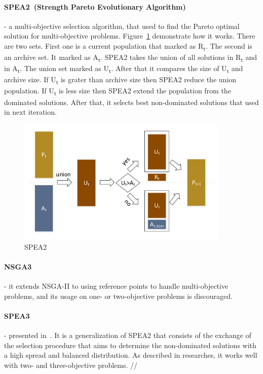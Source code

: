 \paragraph{SPEA2~(Strength Pareto Evolutionary Algorithm)~\cite{zitzler01}} - a multi-objective selection algorithm, that used to find the Pareto optimal solution for multi-objective problems\cite{zhihuan2010}. Figure~\ref{fig:spea2} demonstrate how it works.
There are two sets. First one is a current population that marked as \texorpdfstring{R\textsubscript{t}}{R t}. The second is an archive set. It marked as \texorpdfstring{A\textsubscript{t}}{A t}. SPEA2 takes the union of all solutions in \texorpdfstring{R\textsubscript{t}}{R t} and in \texorpdfstring{A\textsubscript{t}}{A t}. The union set marked as \texorpdfstring{U\textsubscript{t}}{U t}. After that it compares the size of \texorpdfstring{U\textsubscript{t}}{U t} and archive size. If \texorpdfstring{U\textsubscript{t}}{U t} is grater than archive size then SPEA2 reduce the union population. If \texorpdfstring{U\textsubscript{t}}{U t} is less  size then SPEA2 extend the population from the dominated solutions. After that, it selects best non-dominated solutions that used in next iteration.

\begin{figure}
	\centering
	\includegraphics[width=0.9\textwidth]{images/spea2Selector.pdf}
	\caption[SPEA2]{SPEA2}
	\label{fig:spea2}
\end{figure}

\paragraph{NSGA3~\cite{deb14}} - it extends NSGA-II to using reference points to handle multi-objective problems, and its usage on one- or two-objective problems is discouraged.
\paragraph{SPEA3} - presented in~\cite{rudzinski15}. It is a generalization of SPEA2 that consists of the exchange of the selection procedure that aims to determine the non-dominated solutions with a high spread and balanced distribution. As described in researches, it works well with two- and three-objective problems. //

